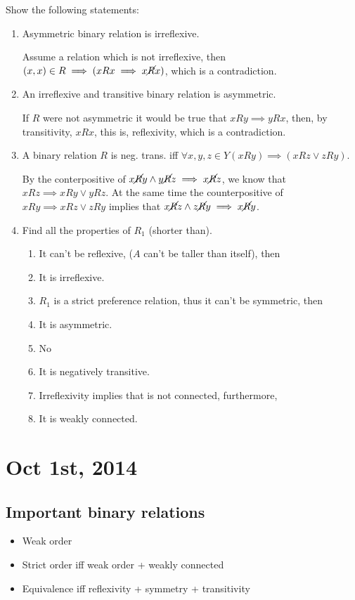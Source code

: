 \documentclass{article}
\def\noR{\cancel{R}}
\begin{document}
 Show the following statements:
\begin{enumerate}
\item Asymmetric binary relation is irreflexive.

 Assume a relation which is not irreflexive, then $(x,x)\in
R \implies (xRx\implies x\noR x)$, which is a contradiction.

\item An irreflexive and transitive binary relation is asymmetric.

 If $R$ were not asymmetric it would be true that $xRy\implies yRx$, then, by
transitivity, $xRx$, this is, reflexivity, which is a contradiction.

\item A binary relation $R$ is neg. trans. iff $\forall x,y,z\in Y (xRy)\implies
(xRz \vee zRy)$.

 By the conterpositive of $x\noR y \wedge y\noR z\implies x\noR z$, we know that
$xRz\implies xRy \vee yRz$. At the same time the counterpositive of $xRy\implies
xRz \vee zRy$ implies that $x\noR z \wedge z\noR y \implies x\noR y$.

\item Find all the properties of $R_1$ (shorter than).

\begin{enumerate}
\item It can't be reflexive, ($A$ can't be taller than itself), then
\item It is irreflexive.
\item $R_1$ is a strict preference relation, thus it can't be symmetric, then
\item It is asymmetric.
\item No
\item It is negatively transitive.
\item Irreflexivity implies that is not connected, furthermore,
\item It is weakly connected.
\end{enumerate}
\end{enumerate}

\section*{Oct 1st, 2014}

\subsection*{Important binary relations}
\begin{itemize}
\item Weak order
\item Strict order iff weak order + weakly connected
\item Equivalence iff reflexivity + symmetry + transitivity
\end{itemize}
\end{document}
